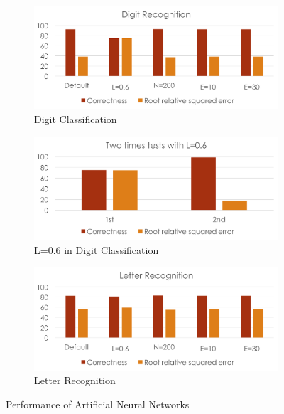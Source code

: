 \documentclass[11pt]{article}
\begin{document}
\begin{figure}[htbp]
\centering

\begin{subfigure}[htbp]{0.46\columnwidth}
\includegraphics*[width=\textwidth]{fig/digit_ANN}
\caption{Digit Classification}
\label{fig:digit-ann}
\end{subfigure}
\hfill
\begin{subfigure}[htbp]{0.46\columnwidth}
\includegraphics*[width=\textwidth]{fig/digit_ANN_special}
\caption{L=0.6 in Digit Classification}
\label{fig:digit-ann-special}
\end{subfigure}
\hfill
\begin{subfigure}[htbp]{0.46\columnwidth}
\includegraphics*[width=\textwidth]{fig/letter_ANN}
\caption{Letter Recognition}
\label{fig:letter-ann}
\end{subfigure}
\caption{Performance of Artificial Neural Networks}
\label{fig:ann}
\end{figure}
\end{document}
